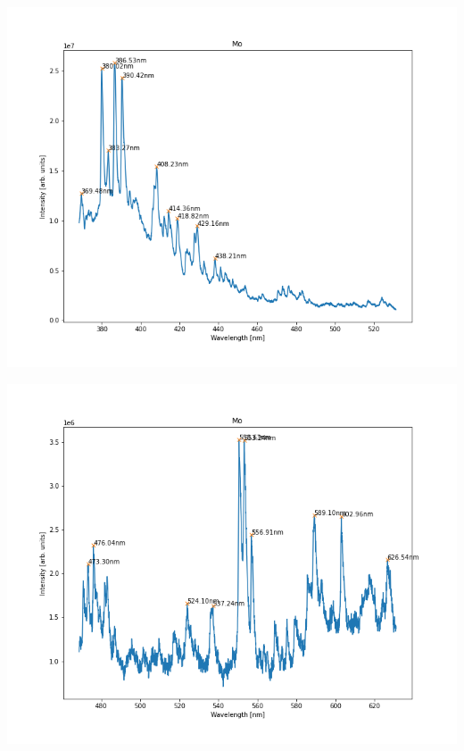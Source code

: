 \documentclass{beamer}
\begin{document}
\begin{frame}
    \includegraphics[scale=0.45]{Mo/Mo_450.png}
\end{frame}

\begin{frame}
    \includegraphics[scale=0.45]{Mo/Mo_550.png}
\end{frame}
\end{document}
